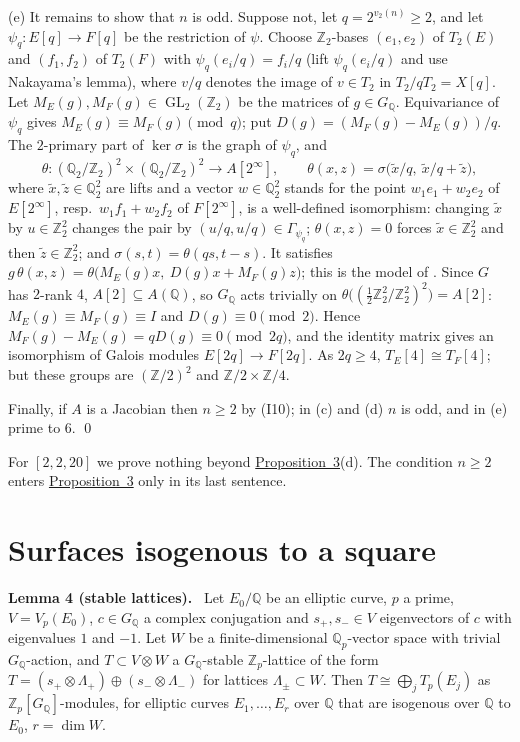 \documentclass[11pt]{article}
\newenvironment{statement}[1]{\par\medskip\noindent\phantomsection\textbf{#1}\ }{\par\medskip}
\newcommand{\Q}{\mathbb Q}
\newcommand{\Z}{\mathbb Z}
\DeclareMathOperator{\GL}{GL}
\begin{document}
(e) It remains to show that \(n\) is odd. Suppose not, let \(q=2^{v_2(n)}\ge2\), and let \(\psi_q\colon E[q]\to
F[q]\) be the restriction of \(\psi\). Choose \(\Z_2\)-bases \((e_1,e_2)\) of \(T_2(E)\) and \((f_1,f_2)\) of
\(T_2(F)\) with \(\psi_q(e_i/q)=f_i/q\) (lift \(\psi_q(e_i/q)\) and use Nakayama's lemma), where \(v/q\) denotes the
image of \(v\in T_2\) in \(T_2/qT_2=X[q]\). Let \(M_E(g),M_F(g)\in\GL_2(\Z_2)\) be the matrices of \(g\in G_{\Q}\).
Equivariance of \(\psi_q\) gives \(M_E(g)\equiv M_F(g)\pmod q\); put \(D(g)=(M_F(g)-M_E(g))/q\). The \(2\)-primary part
of \(\ker\sigma\) is the graph of \(\psi_q\), and
\[\theta\colon(\Q_2/\Z_2)^2\times(\Q_2/\Z_2)^2\to A[2^\infty],\qquad
\theta(x,z)=\sigma\bigl(\tilde x/q,\ \tilde x/q+\tilde z\bigr),\]
where \(\tilde x,\tilde z\in\Q_2^2\) are lifts and a vector \(w\in\Q_2^2\) stands for the point \(w_1e_1+w_2e_2\) of
\(E[2^\infty]\), resp.~\(w_1f_1+w_2f_2\) of \(F[2^\infty]\), is a well-defined isomorphism: changing \(\tilde x\) by
\(u\in\Z_2^2\) changes the pair by \((u/q,u/q)\in\Gamma_{\psi_q}\); \(\theta(x,z)=0\) forces \(\tilde x\in\Z_2^2\)
and then \(\tilde z\in\Z_2^2\); and \(\sigma(s,t)=\theta(qs,t-s)\). It satisfies
\(g\,\theta(x,z)=\theta\bigl(M_E(g)x,\ D(g)x+M_F(g)z\bigr)\); this is the model of \cite[Section~2]{P256}. Since \(G\) has \(2\)-rank \(4\), \(A[2]\subseteq
A(\Q)\), so \(G_{\Q}\) acts trivially on \(\theta\bigl((\tfrac12\Z_2^2/\Z_2^2)^2\bigr)=A[2]\): \(M_E(g)\equiv
M_F(g)\equiv I\) and \(D(g)\equiv0\pmod 2\). Hence \(M_F(g)-M_E(g)=qD(g)\equiv0\pmod{2q}\), and the identity matrix
gives an isomorphism of Galois modules \(E[2q]\to F[2q]\). As \(2q\ge4\), \(T_E[4]\cong T_F[4]\); but these groups
are \((\Z/2)^2\) and \(\Z/2\times\Z/4\).

Finally, if \(A\) is a Jacobian then \(n\ge2\) by (I10); in (c) and (d) \(n\) is odd, and in (e) prime to \(6\).
\qed

\medskip
For \([2,2,20]\) we prove nothing beyond \hyperref[prop-parents]{Proposition~3}(d). The condition \(n\ge2\) enters
\hyperref[prop-parents]{Proposition~3} only in its last sentence.

\section{Surfaces isogenous to a square}\label{sec-isotypic}

\begin{statement}{Lemma 4 (stable lattices).}\label{lemma-lattices}
Let \(E_0/\Q\) be an elliptic curve, \(p\) a prime, \(V=V_p(E_0)\), \(c\in G_{\Q}\) a complex conjugation and
\(s_{+},s_{-}\in V\) eigenvectors of \(c\) with eigenvalues \(1\) and \(-1\). Let \(W\) be a finite-dimensional
\(\Q_p\)-vector space with trivial \(G_{\Q}\)-action, and \(T\subset V\otimes W\) a \(G_{\Q}\)-stable
\(\Z_p\)-lattice of the form \(T=(s_{+}\otimes\Lambda_{+})\oplus(s_{-}\otimes\Lambda_{-})\) for lattices
\(\Lambda_\pm\subset W\). Then \(T\cong\bigoplus_jT_p(E_j)\) as \(\Z_p[G_{\Q}]\)-modules, for elliptic curves
\(E_1,\dots,E_r\) over \(\Q\) that are isogenous over \(\Q\) to \(E_0\), \(r=\dim W\).
\end{statement}
\end{document}
